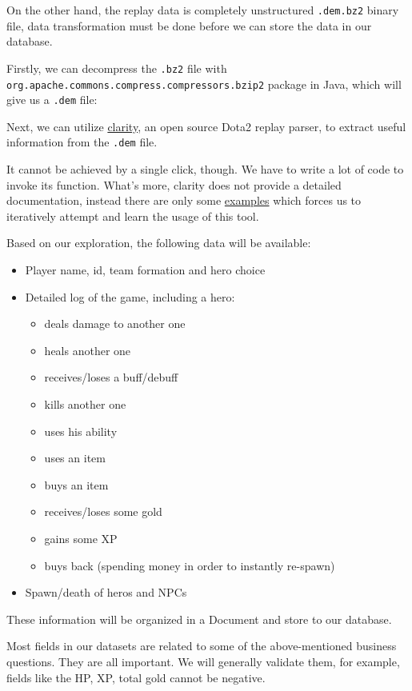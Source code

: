 \documentclass{article}
\newcommand{\codeinline}[1]{
	\texttt{#1}
}
\begin{document}
On the other hand, the replay data is completely unstructured \codeinline{.dem.bz2} binary file,
data transformation must be done before we can store the data in our database.

Firstly, we can decompress the \codeinline{.bz2} file with \codeinline{org.apache.commons.compress.compressors.bzip2} package in Java,
which will give us a \codeinline{.dem} file:

Next, we can utilize \href{https://github.com/skadistats/clarity}{clarity},
an open source Dota2 replay parser, to extract useful information from the \codeinline{.dem} file.

It cannot be achieved by a single click, though. We have to write a lot of code to invoke its function.
What's more, clarity does not provide a detailed documentation, instead there are only some \href{https://github.com/skadistats/clarity-examples}{examples} which forces us to iteratively attempt and learn the usage of this tool.

Based on our exploration, the following data will be available:

\begin{itemize}
	\item Player name, id, team formation and hero choice
	\item Detailed log of the game, including a hero:
	\begin{itemize}
		\item deals damage to another one
		\item heals another one
		\item receives/loses a buff/debuff
		\item kills another one
		\item uses his ability
		\item uses an item
		\item buys an item
		\item receives/loses some gold
		\item gains some XP
		\item buys back (spending money in order to instantly re-spawn)
	\end{itemize}
	\item Spawn/death of heros and NPCs
\end{itemize}

These information will be organized in a Document and store to our database.

Most fields in our datasets are related to some of the above-mentioned business questions.
They are all important.
We will generally validate them, for example, fields like the HP, XP, total gold cannot be negative.
\end{document}

